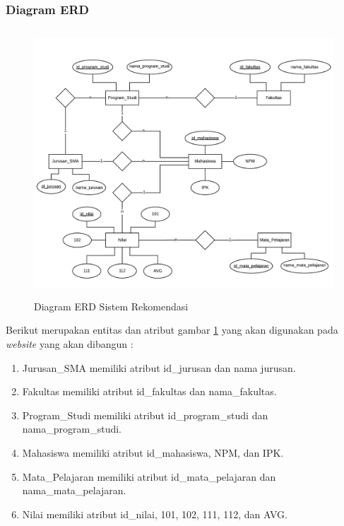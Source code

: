 \subsubsection{Diagram ERD}
\label{diagram erd}

\begin{figure}[H]
    \centering
    \includegraphics[width = 12cm, height = 10cm ]{doc/DokumenSkripsi/Gambar/gambar37.png}
    \caption{Diagram ERD Sistem Rekomendasi}
    \label{fig:diagram erd}
\end{figure}

Berikut merupakan entitas dan atribut gambar \ref{fig:diagram erd} yang akan digunakan pada \textit{website} yang akan dibangun :

\begin{enumerate}
    \item Jurusan\_SMA memiliki atribut id\_jurusan dan nama jurusan.
    
    \item Fakultas memiliki atribut id\_fakultas dan nama\_fakultas.
    
    \item Program\_Studi memiliki atribut id\_program\_studi dan nama\_program\_studi.
    
    \item Mahasiswa memiliki atribut id\_mahasiswa, NPM, dan IPK.
    
    \item Mata\_Pelajaran memiliki atribut id\_mata\_pelajaran dan nama\_mata\_pelajaran.
    
    \item Nilai memiliki atribut id\_nilai, 101, 102, 111, 112, dan AVG. 
\end{enumerate}

